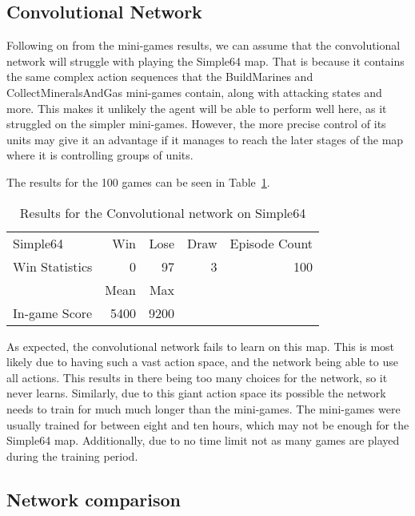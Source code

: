 \subsection{Convolutional Network}

Following on from the mini-games results, we can assume that the convolutional
network will struggle with playing the Simple64 map. That is because it contains
the same complex action sequences that the BuildMarines and
CollectMineralsAndGas mini-games contain, along with attacking states and more.
This makes it unlikely the agent will be able to perform well here, as it
struggled on the simpler mini-games. However, the more precise control of its
units may give it an advantage if it manages to reach the later stages of the
map where it is controlling groups of units.

The results for the 100 games can be seen in Table~\ref{tab:cnn_simple}.

\begin{table}[h]
    \centering
    \begin{tabular}{@{}lrrrr@{}}
        \toprule
        Simple64        & Win  & Lose  & Draw & Episode Count \\
        Win Statistics  & 0    & 97    & 3 & 100           \\
        \midrule
        \midrule
                      & Mean & Max  \\
        In-game Score & 5400 & 9200 \\
 \bottomrule
    \end{tabular}
    \caption{Results for the Convolutional network on Simple64}%
    \label{tab:cnn_simple}%
\end{table}

As expected, the convolutional network fails to learn on this map. This is most
likely due to having such a vast action space, and the network being able to use
all actions. This results in there being too many choices for the network, so it
never learns. Similarly, due to this giant action space its possible the network
needs to train for much much longer than the mini-games. The mini-games were
usually trained for between eight and ten hours, which may not be enough for the
Simple64 map. Additionally, due to no time limit not as many games are played
during the training period.

\subsection{Network comparison}

